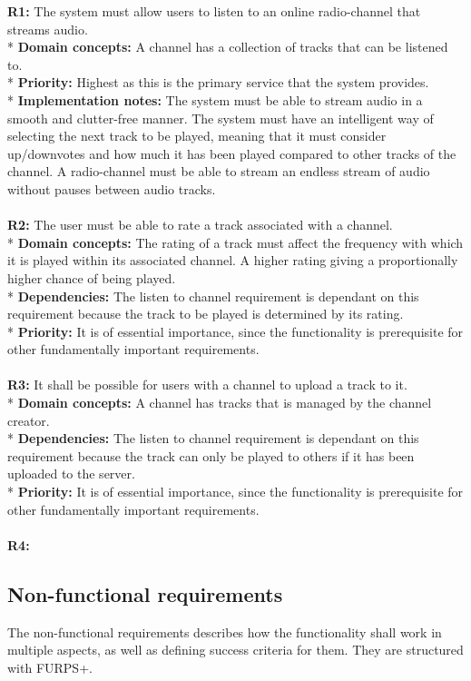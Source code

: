 \documentclass[a4paper,11pt,report]{article}
\begin{document}
\textbf{R1:}
The system must allow users to listen to an online radio-channel that streams audio. \\*
\textbf{Domain concepts:}
A channel has a collection of tracks that can be listened to. \\*
\textbf{Priority:}
Highest as this is the primary service that the system provides. \\*
\textbf{Implementation notes:}
The system must be able to stream audio in a smooth and clutter-free manner. The system must have an intelligent way of selecting the next track to be played, meaning that it must consider up/downvotes and how much it has been played compared to other tracks of the channel.
A radio-channel must be able to stream an endless stream of audio without pauses between audio tracks.
\\ \\

\textbf{R2:}
The user must be able to rate a track associated with a channel. \\*
\textbf{Domain concepts:}
The rating of a track must affect the frequency with which it is played within its associated channel.
A higher rating giving a proportionally higher chance of being played. \\*
\textbf{Dependencies:}
The listen to channel requirement is dependant on this requirement because the track to be played is determined by its rating.\\*
\textbf{Priority:}
It is of essential importance, since the functionality is prerequisite for other fundamentally important requirements.
\\ \\

\textbf{R3:}
It shall be possible for users with a channel to upload a track to it. \\*
\textbf{Domain concepts:}
A channel has tracks that is managed by the channel creator. \\*
\textbf{Dependencies:}
The listen to channel requirement is dependant on this requirement because the track can only be played to others if it has been uploaded to the server.\\*
\textbf{Priority:}
It is of essential importance, since the functionality is prerequisite for other fundamentally important requirements.
\\ \\

\textbf{R4:}


\subsection{Non-functional requirements}
The non-functional requirements describes how the functionality shall work in multiple aspects, as well as defining success criteria for them. They are structured with FURPS+. \\
\end{document}
